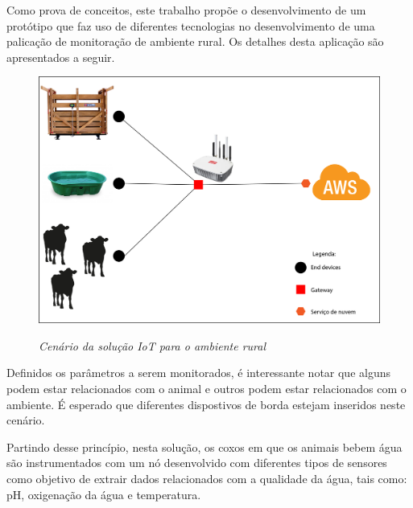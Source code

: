 \documentclass[
    hidelinks,
	12pt,				%
	openany,
	oneside, 
	a4paper,			%
	english,			%
	french,				%
	spanish,			%
	brazil				%
	]{abntex2}
\begin{document}
Como prova de conceitos, este trabalho propõe o desenvolvimento de um protótipo que faz uso de diferentes tecnologias no desenvolvimento de uma palicação de monitoração de ambiente rural. Os detalhes desta aplicação são apresentados a seguir. 

\begin{figure}[h]
    \centering
    \caption{\textit{Cenário da solução IoT para o ambiente rural}}
    \includegraphics[width=1\textwidth]{big-picture.png}
    \label{fig:bigpic}
\end{figure}

Definidos os parâmetros a serem monitorados, é interessante notar que alguns podem estar relacionados com o animal e outros podem estar relacionados com o ambiente. É esperado que diferentes dispostivos de borda estejam inseridos neste cenário.

Partindo desse princípio, nesta solução,  os coxos em que os animais bebem água são instrumentados com  um nó desenvolvido com diferentes tipos de sensores como objetivo de extrair dados relacionados com a qualidade da  água, tais como:  pH, oxigenação da água e temperatura. 

\end{document}

